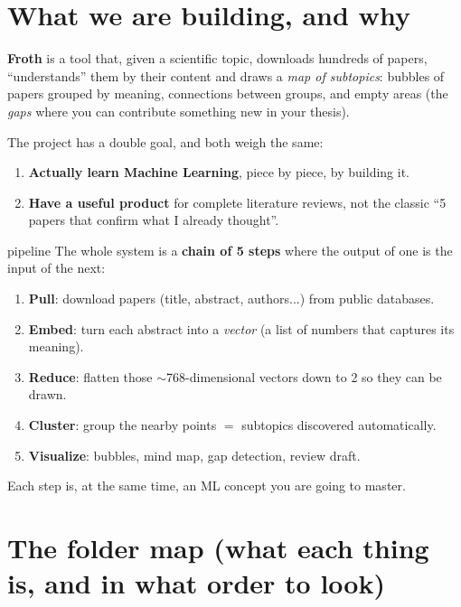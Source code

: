 \documentclass[11pt,a4paper]{article}
\begin{document}

\section{What we are building, and why}

\textbf{Froth} is a tool that, given a scientific topic, downloads hundreds of papers,
``understands'' them by their content and draws a \emph{map of subtopics}: bubbles of
papers grouped by meaning, connections between groups, and empty areas (the \emph{gaps}
where you can contribute something new in your thesis).

The project has a double goal, and both weigh the same:
\begin{enumerate}
  \item \textbf{Actually learn Machine Learning}, piece by piece, by building it.
  \item \textbf{Have a useful product} for complete literature reviews, not the classic
        ``5 papers that confirm what I already thought''.
\end{enumerate}

\begin{concepto}{pipeline}
The whole system is a \textbf{chain of 5 steps} where the output of one is the input of
the next:
\begin{center}
\end{center}
\begin{enumerate}
  \item \textbf{Pull}: download papers (title, abstract, authors...) from public databases.
  \item \textbf{Embed}: turn each abstract into a \emph{vector} (a list of numbers that captures its meaning).
  \item \textbf{Reduce}: flatten those $\sim$768-dimensional vectors down to 2 so they can be drawn.
  \item \textbf{Cluster}: group the nearby points $=$ subtopics discovered automatically.
  \item \textbf{Visualize}: bubbles, mind map, gap detection, review draft.
\end{enumerate}
Each step is, at the same time, an ML concept you are going to master.
\end{concepto}

\section{The folder map (what each thing is, and in what order to look)}
\end{document}
